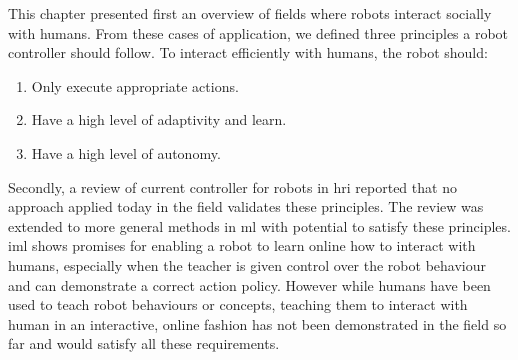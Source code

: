 This chapter presented first an overview of fields where robots interact socially with humans. From these cases of application, we defined three principles a robot controller should follow. To interact efficiently with humans, the robot should:
\begin{enumerate}
   	\item Only execute appropriate actions.
   	\item Have a high level of adaptivity and learn.
   	\item Have a high level of autonomy.
\end{enumerate}

Secondly, a review of current controller for robots in \gls{hri} reported that no approach applied today in the field validates these principles. The review was extended to more general methods in \gls{ml} with potential to satisfy these principles. \gls{iml} shows promises for enabling a robot to learn online how to interact with humans, especially when the teacher is given control over the robot behaviour and can demonstrate a correct action policy. However while humans have been used to teach robot behaviours or concepts, teaching them to interact with human in an interactive, online fashion has not been demonstrated in the field so far and would satisfy all these requirements.